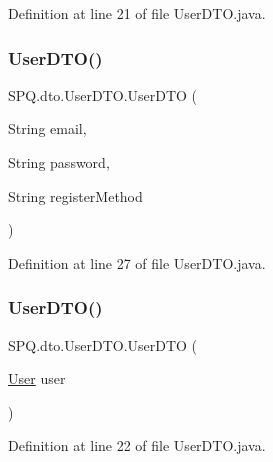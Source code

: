 Definition at line 21 of file User\+D\+T\+O.\+java.

\mbox{\label{class_s_p_q_1_1dto_1_1_user_d_t_o_a97b230ddb1c2eb2cbd7ced33922fb2d2}} 
\subsubsection{\texorpdfstring{User\+D\+T\+O()}{UserDTO()}\hspace{0.1cm}{\footnotesize\ttfamily [6/11]}}
{\footnotesize\ttfamily S\+P\+Q.\+dto.\+User\+D\+T\+O.\+User\+D\+TO (\begin{DoxyParamCaption}\item[{String}]{email,  }\item[{String}]{password,  }\item[{String}]{register\+Method }\end{DoxyParamCaption})}



Definition at line 27 of file User\+D\+T\+O.\+java.

\mbox{\label{class_s_p_q_1_1dto_1_1_user_d_t_o_a40cad7b1dea2117ed4cb0e69fdc6b929}} 
\subsubsection{\texorpdfstring{User\+D\+T\+O()}{UserDTO()}\hspace{0.1cm}{\footnotesize\ttfamily [7/11]}}
{\footnotesize\ttfamily S\+P\+Q.\+dto.\+User\+D\+T\+O.\+User\+D\+TO (\begin{DoxyParamCaption}\item[{\mbox{\hyperlink{class_s_p_q_1_1data_1_1_user}{User}}}]{user }\end{DoxyParamCaption})}



Definition at line 22 of file User\+D\+T\+O.\+java.

